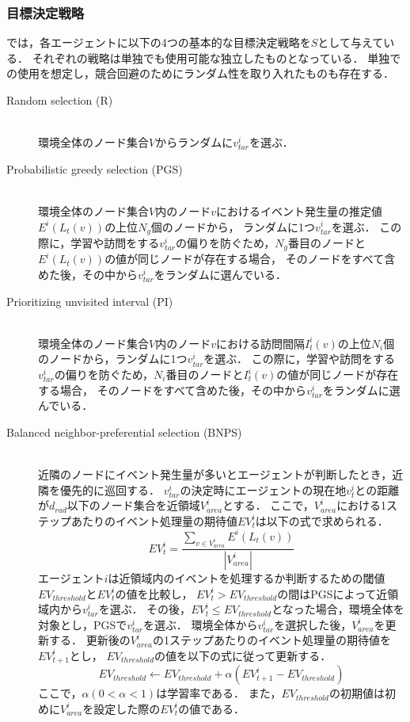 \documentclass[12pt,a4j,twoside]{jarticle}
\begin{document}
\subsubsection{目標決定戦略}\label{target_strategy}
\cite{Yoneda2013}では，各エージェントに以下の4つの基本的な目標決定戦略を$S$として与えている．
それぞれの戦略は単独でも使用可能な独立したものとなっている．
単独での使用を想定し，競合回避のためにランダム性を取り入れたものも存在する．
%
\begin{description}
  \item[Random selection (R)]\mbox{}\\
  環境全体のノード集合$V$からランダムに$v^i_{tar}$を選ぶ．

  \item[Probabilistic greedy selection (PGS)]\mbox{} \\
  環境全体のノード集合$V$内のノード$v$におけるイベント発生量の推定値$E^i(L_t(v))$の上位$N_g$個のノードから，
  ランダムに1つ$v^i_{tar}$を選ぶ．
  この際に，学習や訪問をする$v^i_{tar}$の偏りを防ぐため，$N_g$番目のノードと$E^i(L_t(v))$の値が同じノードが存在する場合，
  そのノードをすべて含めた後，その中から$v^i_{tar}$をランダムに選んでいる．

  \item[Prioritizing unvisited interval (PI)]\mbox{} \\
  環境全体のノード集合$V$内のノード$v$における訪問間隔$I^i_t(v)$の上位$N_i$個のノードから，ランダムに1つ$v^i_{tar}$を選ぶ．
  この際に，学習や訪問をする$v^i_{tar}$の偏りを防ぐため，$N_i$番目のノードと$I^i_t(v)$の値が同じノードが存在する場合，
  そのノードをすべて含めた後，その中から$v^i_{tar}$をランダムに選んでいる．
  
  \item[Balanced neighbor-preferential selection (BNPS)]\mbox{} \\
  近隣のノードにイベント発生量が多いとエージェントが判断したとき，近隣を優先的に巡回する．
  $v^i_{tar}$の決定時にエージェントの現在地$v^i_t$との距離が$d_{rad}$以下のノード集合を近領域$V^i_{area}$とする．
  ここで，$V^i_{area}$における1ステップあたりのイベント処理量の期待値$EV^i_t$は以下の式で求められる．
  \begin{equation}
    EV^i_t = \frac{\displaystyle \sum_{v \in V^i_{area}}E^i(L_t(v))}{|V^i_{area}|}  
  \end{equation}
  エージェント$i$は近領域内のイベントを処理するか判断するための閾値$EV_{threshold}$と$EV^i_t$の値を比較し，
  $EV^i_t > EV_{threshold}$の間はPGSによって近領域内から$v^i_{tar}$を選ぶ．
  その後，$EV^i_t \le EV_{threshold}$となった場合，環境全体を対象とし，PGSで$v^i_{tar}$を選ぶ．
  環境全体から$v^i_{tar}$を選択した後，$V^i_{area}$を更新する．
  更新後の$V^i_{area}$の1ステップあたりのイベント処理量の期待値を$EV^i_{t+1}$とし，
  $EV_{threshold}$の値を以下の式に従って更新する．
  \begin{equation}
    EV_{threshold} \gets EV_{threshold} + \alpha(EV^i_{t+1} - EV_{threshold})
  \end{equation}
  ここで，$\alpha(0 < \alpha < 1)$は学習率である．
  また，$EV_{threshold}$の初期値は初めに$V^i_{area}$を設定した際の$EV^i_t$の値である．
\end{description}
%
\end{document}
